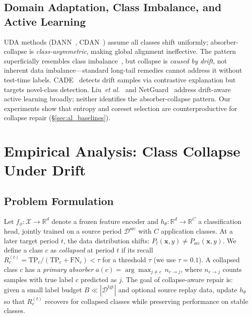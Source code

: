 \documentclass[journal]{IEEEtran}
\makeatletter
\newcommand{\etal}{\textit{et al.}\@}
\makeatother
\begin{document}
\subsection{Domain Adaptation, Class Imbalance, and Active Learning}

UDA methods (DANN~\cite{ganin2016dann}, CDAN~\cite{long2018cdan}) assume all classes shift uniformly; absorber-collapse is \textit{class-asymmetric}, making global alignment ineffective.
The pattern superficially resembles class imbalance~\cite{kang2020decoupling, menon2021longtail}, but collapse is \textit{caused by drift}, not inherent data imbalance---standard long-tail remedies cannot address it without test-time labels.
CADE~\cite{yang2021cade} detects drift samples via contrastive explanation but targets novel-class detection.
Liu~\etal{}~\cite{micfoal2023} and NetGuard~\cite{netguard2025} address drift-aware active learning broadly; neither identifies the absorber-collapse pattern. Our experiments show that entropy and coreset selection are counterproductive for collapse repair (\S\ref{sec:al_baselines}).


\section{Empirical Analysis: Class Collapse Under Drift}
\label{sec:analysis}

\subsection{Problem Formulation}
\label{sec:problem}

Let $f_\phi: \mathcal{X} \to \mathbb{R}^d$ denote a frozen feature encoder and $h_\theta: \mathbb{R}^d \to \mathbb{R}^C$ a classification head, jointly trained on a source period $\mathcal{D}^{\text{src}}$ with $C$ application classes.
At a later target period $t$, the data distribution shifts: $P_t(\mathbf{x}, y) \neq P_{\text{src}}(\mathbf{x}, y)$.
We define a class $c$ as \textit{collapsed} at period $t$ if its recall $R_c^{(t)} = \text{TP}_c / ({\text{TP}_c + \text{FN}_c}) < \tau$ for a threshold $\tau$ (we use $\tau{=}0.1$).
A collapsed class $c$ has a \textit{primary absorber} $a(c) = \arg\max_{j \neq c}\, n_{c \to j}$, where $n_{c \to j}$ counts samples with true label $c$ predicted as $j$.
The goal of collapse-aware repair is: given a small label budget $B \ll |\mathcal{D}^{\text{tgt}}|$ and optional source replay data, update $h_\theta$ so that $R_c^{(t)}$ recovers for collapsed classes while preserving performance on stable classes.
\end{document}
